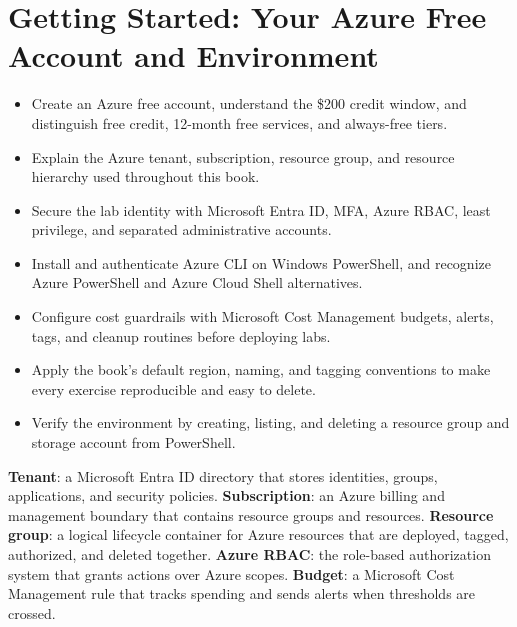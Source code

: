 \chapter{Getting Started: Your Azure Free Account and Environment}
%


\begin{objectives}
\begin{itemize}
    \item Create an Azure free account, understand the \$200 credit window, and distinguish free credit, 12-month free services, and always-free tiers.
    \item Explain the Azure tenant, subscription, resource group, and resource hierarchy used throughout this book.
    \item Secure the lab identity with Microsoft Entra ID, MFA, Azure RBAC, least privilege, and separated administrative accounts.
    \item Install and authenticate Azure CLI on Windows PowerShell, and recognize Azure PowerShell and Azure Cloud Shell alternatives.
    \item Configure cost guardrails with Microsoft Cost Management budgets, alerts, tags, and cleanup routines before deploying labs.
    \item Apply the book's default region, naming, and tagging conventions to make every exercise reproducible and easy to delete.
    \item Verify the environment by creating, listing, and deleting a resource group and storage account from PowerShell.
\end{itemize}
\end{objectives}

\begin{keyterms}
\textbf{Tenant}: a Microsoft Entra ID directory that stores identities, groups, applications, and security policies.\quad
\textbf{Subscription}: an Azure billing and management boundary that contains resource groups and resources.\quad
\textbf{Resource group}: a logical lifecycle container for Azure resources that are deployed, tagged, authorized, and deleted together.\quad
\textbf{Azure RBAC}: the role-based authorization system that grants actions over Azure scopes.\quad
\textbf{Budget}: a Microsoft Cost Management rule that tracks spending and sends alerts when thresholds are crossed.
\end{keyterms}

